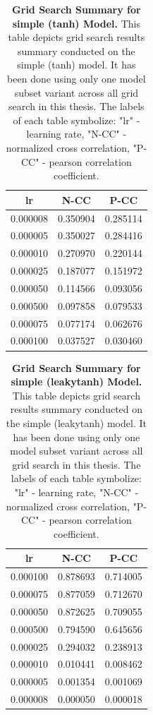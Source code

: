 \begin{table}
    \centering\footnotesize\sf
    \begin{tabular}{ccc}
    \toprule
    lr & N-CC & P-CC \\
    \midrule
    0.000008 & 0.350904 & 0.285114 \\
    0.000005 & 0.350027 & 0.284416 \\
    0.000010 & 0.270970 & 0.220144 \\
    0.000025 & 0.187077 & 0.151972 \\
    0.000050 & 0.114566 & 0.093056 \\
    0.000500 & 0.097858 & 0.079533 \\
    0.000075 & 0.077174 & 0.062676 \\
    0.000100 & 0.037527 & 0.030460 \\
    \bottomrule
    \end{tabular}
    \caption{\textbf{Grid Search Summary for simple (tanh) Model.} This table depicts grid search results summary conducted on the simple (tanh) model. It has been done using only one model subset variant across all grid search in this thesis. The labels of each table symbolize: "lr" - learning rate, "N-CC" - normalized cross correlation, "P-CC" - pearson correlation coefficient.}
    \label{tab:grid_simple_tanh}
\end{table}

\begin{table}
    \centering\footnotesize\sf
    \begin{tabular}{ccc}
    \toprule
    lr & N-CC & P-CC \\
    \midrule
    0.000100 & 0.878693 & 0.714005 \\
    0.000075 & 0.877059 & 0.712670 \\
    0.000050 & 0.872625 & 0.709055 \\
    0.000500 & 0.794590 & 0.645656 \\
    0.000025 & 0.294032 & 0.238913 \\
    0.000010 & 0.010441 & 0.008462 \\
    0.000005 & 0.001354 & 0.001069 \\
    0.000008 & 0.000050 & 0.000018 \\
    \bottomrule
    \end{tabular}
    \caption{\textbf{Grid Search Summary for simple (leakytanh) Model.} This table depicts grid search results summary conducted on the simple (leakytanh) model. It has been done using only one model subset variant across all grid search in this thesis. The labels of each table symbolize: "lr" - learning rate, "N-CC" - normalized cross correlation, "P-CC" - pearson correlation coefficient.}
    \label{tab:grid_simple_leakytanh}
\end{table}

